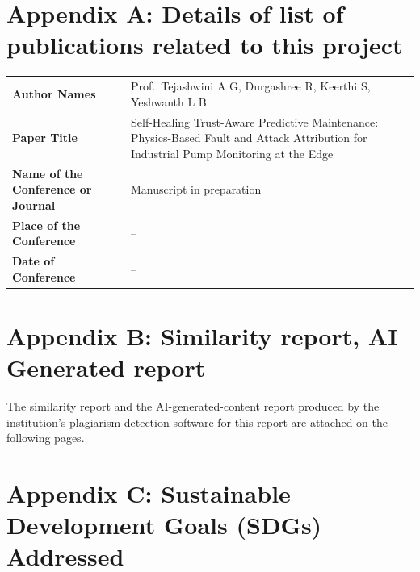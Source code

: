 \section{Appendix A: Details of list of publications related to this project}

\begin{table}[H]
\centering
\renewcommand{\arraystretch}{1.4}
\begin{tabularx}{\textwidth}{@{}p{5.2cm} X@{}}
\toprule
\textbf{Author Names} & Prof.\ Tejashwini A G, Durgashree R, Keerthi S, Yeshwanth L B \\
\textbf{Paper Title} & Self-Healing Trust-Aware Predictive Maintenance: Physics-Based Fault and Attack Attribution for Industrial Pump Monitoring at the Edge \\
\textbf{Name of the Conference or Journal} & Manuscript in preparation \\
\textbf{Place of the Conference} & -- \\
\textbf{Date of Conference} & -- \\
\bottomrule
\end{tabularx}
\end{table}

\clearpage

\section{Appendix B: Similarity report, AI Generated report}

The similarity report and the AI-generated-content report produced by the institution's plagiarism-detection software for this report are attached on the following pages.

\clearpage

\section{Appendix C: Sustainable Development Goals (SDGs) Addressed}

\begin{center}
\end{center}

